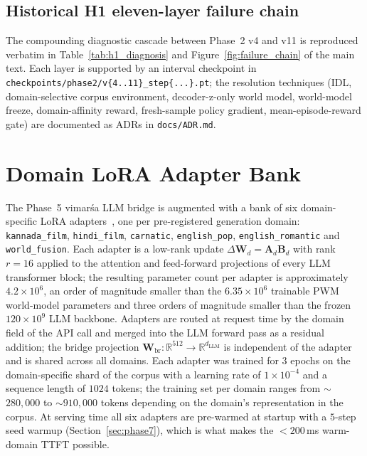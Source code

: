 \documentclass[journal,onecolumn,11pt]{IEEEtran}
\begin{document}
\subsection{Historical H1 eleven-layer failure chain}
The compounding diagnostic cascade between Phase~2 v4 and v11 is reproduced
verbatim in Table~\ref{tab:h1_diagnosis} and Figure~\ref{fig:failure_chain}
of the main text.
Each layer is supported by an interval checkpoint in
\texttt{checkpoints/phase2/v\{4..11\}\_step\{...\}.pt}; the resolution
techniques (IDL, domain-selective corpus environment, decoder-z-only world
model, world-model freeze, domain-affinity reward, fresh-sample policy
gradient, mean-episode-reward gate) are documented as ADRs in
\texttt{docs/ADR.md}.

\section{Domain LoRA Adapter Bank}\label{app:lora}

The Phase~5 vimarśa LLM bridge is augmented with a bank of six
domain-specific LoRA adapters~\cite{hu2022lora}, one per pre-registered
generation domain: \texttt{kannada\_film}, \texttt{hindi\_film},
\texttt{carnatic}, \texttt{english\_pop}, \texttt{english\_romantic} and
\texttt{world\_fusion}.
Each adapter is a low-rank update
$\Delta \mathbf{W}_d = \mathbf{A}_d \mathbf{B}_d$ with rank
$r = 16$ applied to the attention and feed-forward projections of every
LLM transformer block; the resulting parameter count per adapter is
approximately $4.2 \times 10^{6}$, an order of magnitude smaller than the
$6.35 \times 10^{6}$ trainable PWM world-model parameters and three orders
of magnitude smaller than the frozen $120 \times 10^{9}$ LLM backbone.
Adapters are routed at request time by the domain field of the API call
and merged into the LLM forward pass as a residual addition; the bridge
projection $\mathbf{W}_{\text{br}}: \mathbb{R}^{512} \to \mathbb{R}^{d_{\text{LLM}}}$
is independent of the adapter and is shared across all domains.
Each adapter was trained for $3$ epochs on the domain-specific shard of
the corpus with a learning rate of $1 \times 10^{-4}$ and a sequence
length of $1024$ tokens; the training set per domain ranges from
$\sim$$280{,}000$ to $\sim$$910{,}000$ tokens depending on the domain's
representation in the corpus.
At serving time all six adapters are pre-warmed at startup with a
$5$-step seed warmup (Section~\ref{sec:phase7}), which is what makes the
$< 200$\,ms warm-domain TTFT possible.
\end{document}
